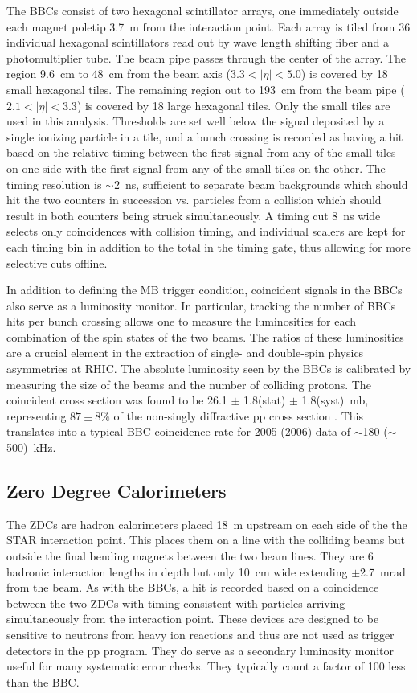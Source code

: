 The BBCs \cite{Kiryluk:2003aw} consist of two hexagonal scintillator arrays,
one immediately outside each magnet poletip 3.7~m from the interaction point.
Each array is tiled from 36 individual hexagonal scintillators read out by
wave length shifting fiber and a photomultiplier tube. The beam pipe passes
through the center of the array. The region 9.6~cm to 48~cm from the beam axis
($3.3 < |\eta| < 5.0$) is covered by 18 small hexagonal tiles. The remaining
region out to 193~cm from the beam pipe ($2.1 < |\eta| < 3.3$) is covered by
18 large hexagonal tiles. Only the small tiles are used in this analysis.
Thresholds are set well below the signal deposited by a single ionizing
particle in a tile, and a bunch crossing is recorded as having a hit based on
the relative timing between the first signal from any of the small tiles on
one side with the first signal from any of the small tiles on the other. The
timing resolution is $\sim$2~ns, sufficient to separate beam backgrounds which
should hit the two counters in succession vs. particles from a collision which
should result in both counters being struck simultaneously. A timing cut 8~ns
wide selects only coincidences with collision timing, and individual scalers
are kept for each timing bin in addition to the total in the timing gate, thus
allowing for more selective cuts offline.

In addition to defining the MB trigger condition, coincident signals in the
BBCs also serve as a luminosity monitor. In particular, tracking the number of
BBCs hits per bunch crossing allows one to measure the luminosities for each
combination of the spin states of the two beams. The ratios of these
luminosities are a crucial element in the extraction of single- and
double-spin physics asymmetries at RHIC. The absolute luminosity seen by the
BBCs is calibrated by measuring the size of the beams and the number of
colliding protons. The coincident cross section was found to be 26.1 $\pm$
1.8(stat) $\pm$ 1.8(syst)~mb, representing $87\pm8\%$ of the non-singly
diffractive pp cross section \cite{Adams:2003kv}. This translates into a
typical BBC coincidence rate for 2005 (2006) data of $\sim$180 ($\sim$500)~kHz.

\subsection{Zero Degree Calorimeters\label{sec:zdc}}

The ZDCs \cite{Adler:2003sp} are hadron calorimeters placed 18~m upstream on
each side of the the STAR interaction point. This places them on a line with
the colliding beams but outside the final bending magnets between the two beam
lines. They are 6 hadronic interaction lengths in depth but only 10~cm wide
extending $\pm$2.7~mrad from the beam. As with the BBCs, a hit is recorded
based on a coincidence between the two ZDCs with timing consistent with
particles arriving simultaneously from the interaction point. These devices
are designed to be sensitive to neutrons from heavy ion reactions and thus are
not used as trigger detectors in the pp program. They do serve as a secondary
luminosity monitor useful for many systematic error checks. They typically
count a factor of 100 less than the BBC.

